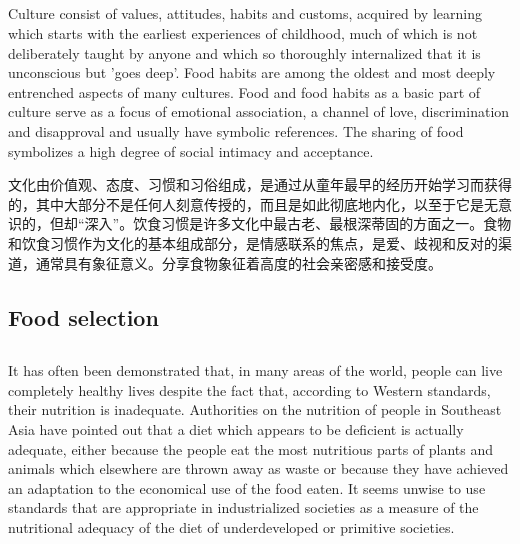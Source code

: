 \documentclass[]{article}
\begin{document}
\subsection{}
\begin{spacing}{2.0}
	{\Large Culture consist of values, attitudes, habits and customs, acquired by learning which starts with the earliest experiences of childhood, much of which is not deliberately taught by anyone and which so thoroughly internalized that it is unconscious but 'goes deep'. Food habits are among the oldest and most deeply entrenched aspects of many cultures. Food and food habits as a basic part of
	culture serve as a focus of emotional association, a channel of love, discrimination and disapproval and usually have symbolic references. The sharing of food symbolizes a high degree of social intimacy and acceptance.}\newline
\end{spacing}

文化由价值观、态度、习惯和习俗组成，是通过从童年最早的经历开始学习而获得的，其中大部分不是任何人刻意传授的，而且是如此彻底地内化，以至于它是无意识的，但却“深入”。饮食习惯是许多文化中最古老、最根深蒂固的方面之一。食物和饮食习惯作为文化的基本组成部分，是情感联系的焦点，是爱、歧视和反对的渠道，通常具有象征意义。分享食物象征着高度的社会亲密感和接受度。

\subsection*{Food selection}
\subsection{}
\begin{spacing}{2.0}
	{\Large It has often been demonstrated that, in many areas of the world, people can live completely healthy lives despite the fact that, according to Western standards, their nutrition is inadequate. Authorities on the nutrition of people in Southeast Asia have pointed out that a diet which appears to be deficient is actually adequate, either because the people eat the most nutritious parts of plants
	and animals which elsewhere are thrown away as waste or because they have achieved an adaptation to the economical use of the food eaten. It seems unwise to use standards that are appropriate in industrialized societies as a measure of the nutritional adequacy of the diet of underdeveloped or primitive societies.}\newline
\end{spacing}
\end{document}
